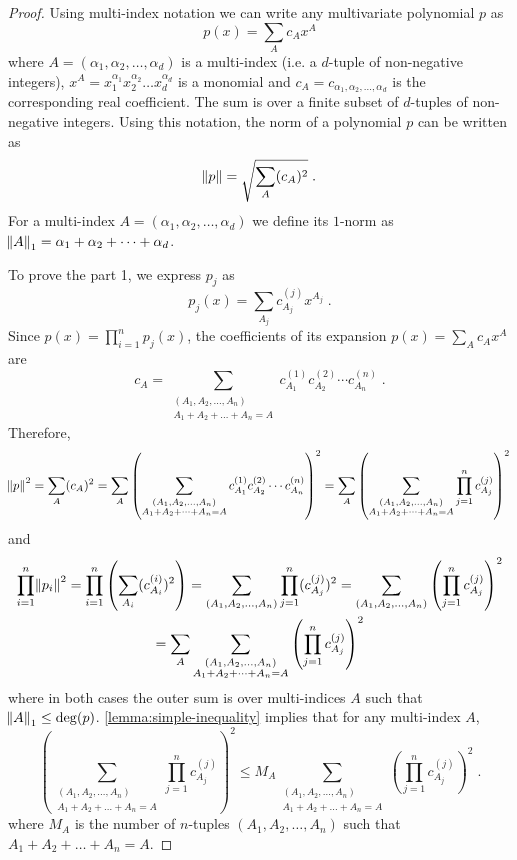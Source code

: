 \documentclass[12pt]{article}
\begin{document}
\begin{proof}
Using multi-index notation we can write any multivariate polynomial $p$ as
$$
p(x) = \sum_A c_A x^A
$$
where $A = (\alpha_1, \alpha_2, \dots, \alpha_d)$ is a multi-index (i.e. a $d$-tuple of
non-negative integers), $x^A = x_1^{\alpha_1} x_2^{\alpha_2} \dots x_d^{\alpha_d}$ is a
monomial and $c_A = c_{\alpha_1, \alpha_2, \dots, \alpha_d}$ is the corresponding real
coefficient. The sum is over a finite subset of $d$-tuples of non-negative
integers. Using this notation, the norm of a polynomial $p$ can be written as
$$
\norm{p} = \sqrt{\sum_A (c_A)^2} \; .
$$
For a multi-index $A = (\alpha_1, \alpha_2, \dots, \alpha_d)$ we define its
$1$-norm as $\norm{A}_1 = \alpha_1 + \alpha_2 + \dots + \alpha_d$.

To prove the part 1, we express $p_j$ as
$$
p_j(x) = \sum_{A_j} c^{(j)}_{A_j} x^{A_j} \; .
$$
Since $p(x) = \prod_{i=1}^n p_j(x)$, the coefficients of its expansion $p(x) =
\sum_A c_A x^A$ are
$$
c_A = \sum_{\substack{(A_1, A_2, \dots, A_n) \\ A_1 + A_2 + \dots + A_n = A}} c^{(1)}_{A_1} c^{(2)}_{A_2} \cdots c^{(n)}_{A_n} \; .
$$
Therefore,
\begin{multline*}
\norm{p}^2
= \sum_{A} (c_A)^2
= \sum_{A} \left( \sum_{\substack{(A_1, A_2, \dots, A_n) \\ A_1 + A_2 + \dots + A_n = A}} c^{(1)}_{A_1} c^{(2)}_{A_2} \cdots c^{(n)}_{A_n} \right)^2
= \sum_{A} \left( \sum_{\substack{(A_1, A_2, \dots, A_n) \\ A_1 + A_2 + \dots + A_n = A}} \prod_{j=1}^n c^{(j)}_{A_j} \right)^2
\end{multline*}
and
\begin{multline*}
\prod_{i=1}^n \norm{p_i}^2
= \prod_{i=1}^n \left( \sum_{A_i} (c^{(i)}_{A_i})^2 \right)
= \sum_{(A_1, A_2, \dots, A_n)} \prod_{j=1}^n (c^{(j)}_{A_j})^2
= \sum_{(A_1, A_2, \dots, A_n)} \left( \prod_{j=1}^n c^{(j)}_{A_j} \right)^2 \\
= \sum_A \sum_{\substack{(A_1, A_2, \dots, A_n) \\ A_1 + A_2 + \dots + A_n = A}} \left( \prod_{j=1}^n c^{(j)}_{A_j} \right)^2
\end{multline*}
where in both cases the outer sum is over multi-indices $A$ such that $\norm{A}_1 \le \deg(p)$.
\autoref{lemma:simple-inequality} implies that for any multi-index $A$,
$$
\left( \sum_{\substack{(A_1, A_2, \dots, A_n) \\ A_1 + A_2 + \dots + A_n = A}} \prod_{j=1}^n c^{(j)}_{A_j} \right)^2
\le M_A \sum_{\substack{(A_1, A_2, \dots, A_n) \\ A_1 + A_2 + \dots + A_n = A}} \left( \prod_{j=1}^n c^{(j)}_{A_j} \right)^2 \; .
$$
where $M_A$ is the number of $n$-tuples $(A_1, A_2, \dots, A_n)$ such that $A_1 +
A_2 + \dots + A_n = A$.


\end{proof}
\end{document}
